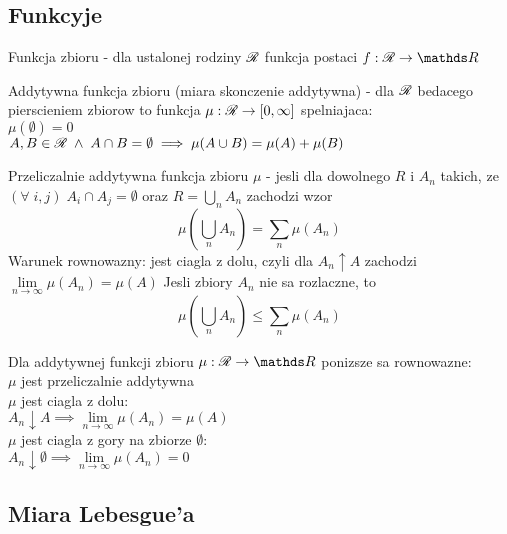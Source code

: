 \bigskip

\subsection{Funkcyje}

\begin{multicols}{2}
    {\color{def}Funkcja zbioru} - dla ustalonej rodziny $\mathcal{R}$ funkcja postaci $f:\rodz R\to\R$\smallskip

    {\color{def}Addytywna funkcja zbioru} (miara skonczenie addytywna) - dla $\mathcal{R}$ bedacego pierscieniem zbiorow to funkcja $\mu:\mathcal{R}\to [0,\infty]$ spelniajaca:\smallskip\\
    \point $\mu(\emptyset) = 0$\smallskip\\
    \point $A,B\in\mathcal{R}\;\land\;A\cap B=\emptyset\implies \mu(A\cup B)=\mu(A)+\mu(B)$\medskip

    {\color{def}Przeliczalnie addytywna funkcja zbioru} $\mu$ - jesli dla dowolnego $R$ i $A_n$ takich, ze $(\forall\;i,j)\;A_i\cap A_j=\emptyset$ oraz $R=\bigcup\limits_n A_n$ zachodzi wzor
    $$\mu(\bigcup\limits_n A_n)=\sum\limits_n\mu(A_n)$$
    {\color{acc}Warunek rownowazny}: jest ciagla z dolu, czyli dla $A_n\uparrow A$ zachodzi $\lim\limits_{n\to\infty}\mu(A_n)=\mu(A)$
    Jesli zbiory $A_n$ nie sa rozlaczne, to 
    $$\mu(\bigcup\limits_n A_n)\leq\sum\limits_n\mu(A_n)$$

    Dla {\color{def}addytywnej funkcji zbioru} $\mu:\rodz R\to \R$ ponizsze sa {\color{def}rownowazne}:\smallskip\\
    \point $\mu$ jest przeliczalnie addytywna\smallskip\\
    \point $\mu$ jest ciagla z dolu: \\
    \indent\indent $A_n\downarrow A\implies \lim\limits_{n\to\infty}\mu(A_n)=\mu(A)$\smallskip\\
    \point $\mu$ jest ciagla z gory na zbiorze $\emptyset$:\\
    \indent\indent $A_n\downarrow\emptyset\implies\lim\limits_{n\to\infty}\mu(A_n)=0$

\end{multicols}\bigskip

\bigskip

\subsection{Miara Lebesgue'a}

